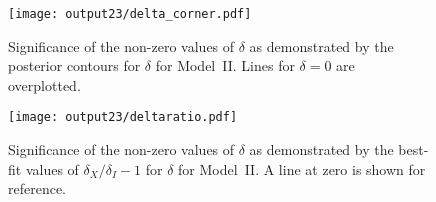 \documentclass{aastex61}   	%
\begin{document}
\begin{figure}[htbp] %
   \centering
   \texttt{[image: output23/delta\_corner.pdf]}
   \caption{Significance of the non-zero values of $\delta$ as demonstrated by the posterior contours for $\delta$ for Model~II.
   Lines for $\delta=0$ are overplotted.
   \label{deltacorner:fig}}
\end{figure}


\begin{figure}[htbp] %
   \centering
      \texttt{[image: output23/deltaratio.pdf]}
   \caption{Significance of the non-zero values of $\delta$ as demonstrated by the best-fit values of $\delta_X/\delta_I-1$ for $\delta$ for Model~II.
   A line at zero is shown for reference.
   \label{deltaratio:fig}}
\end{figure}
\end{document}
